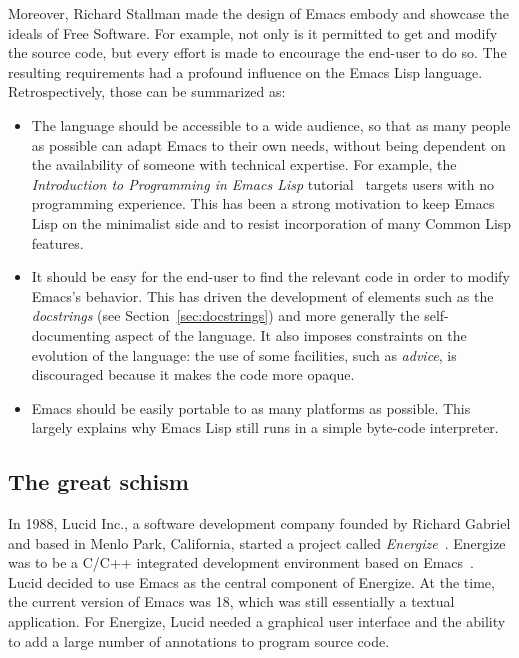 \documentclass[format=acmsmall, review]{acmart}
\newcommand \Elisp {Emacs Lisp}
\begin{document}
Moreover, Richard Stallman made the design of Emacs embody and showcase
the ideals of Free Software.  For example, not only is it permitted to get
and modify the source code, but every effort is made to encourage the
end-user to do so.  The resulting requirements had a profound influence on
the \Elisp{} language.  Retrospectively, those
can be summarized as:
\begin{itemize}
\item The language should be accessible to a wide audience, so that as many
  people as possible can adapt Emacs to their own needs, without being
  dependent on the availability of someone with technical expertise.
  For example, the
  \emph{Introduction to Programming in Emacs Lisp}
  tutorial~\citep{ElispIntro} targets users with no programming
  experience.  This has been a strong motivation to keep \Elisp{} on the
  minimalist side and to resist incorporation of many Common Lisp features.
\item It should be easy for the end-user to find the relevant code in order
  to modify Emacs's behavior.  This has driven the development of elements
  such as the \emph{docstrings} (see Section~\ref{sec:docstrings}) and more generally the self-documenting
  aspect of the language.  It also imposes constraints on the evolution of
  the language: the use of some facilities, such as \emph{advice}, is
  discouraged because it makes the code more opaque.
\item Emacs should be easily portable to as many platforms as possible.
  This largely explains why \Elisp{} still runs in a simple byte-code interpreter.
\end{itemize}

\subsection{The great schism}
\label{sec:schism}
In 1988, Lucid Inc., a software development company founded by Richard
Gabriel and based in Menlo
Park, California, started a project called \emph{Energize}~\cite{GabrielEtAl1990,Gabriel-personal}.
Energize was to be a C/C++ integrated development environment based on
Emacs~\cite{GabrielLetter}.  Lucid decided to use Emacs as the central
component of Energize.  At the time, the current version of Emacs was
18, which was still essentially a textual application.
For Energize, Lucid needed a graphical user
interface and the ability to add a large number of annotations to
program source code.
\end{document}
